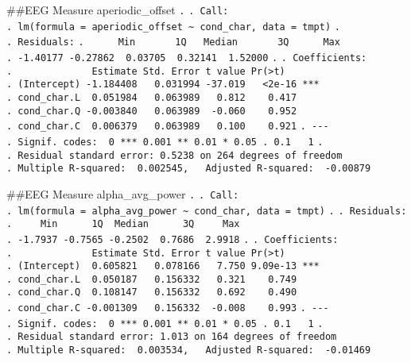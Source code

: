 \documentclass[
]{article}
\begin{document}
\#\#EEG Measure aperiodic\_offset \texttt{.} \texttt{.\ Call:}
\texttt{.\ lm(formula\ =\ aperiodic\_offset\ \textasciitilde{}\ cond\_char,\ data\ =\ tmpt)}
\texttt{.} \texttt{.\ Residuals:}
\texttt{.\ \ \ \ \ \ Min\ \ \ \ \ \ \ 1Q\ \ \ Median\ \ \ \ \ \ \ 3Q\ \ \ \ \ \ Max}
\texttt{.\ -1.40177\ -0.27862\ \ 0.03705\ \ 0.32141\ \ 1.52000}
\texttt{.} \texttt{.\ Coefficients:}
\texttt{.\ \ \ \ \ \ \ \ \ \ \ \ \ \ Estimate\ Std.\ Error\ t\ value\ Pr(\textgreater{}\textbar{}t\textbar{})}
\texttt{.\ (Intercept)\ -1.184408\ \ \ 0.031994\ -37.019\ \ \ \textless{}2e-16\ ***}
\texttt{.\ cond\_char.L\ \ 0.051984\ \ \ 0.063989\ \ \ 0.812\ \ \ \ 0.417}
\texttt{.\ cond\_char.Q\ -0.003840\ \ \ 0.063989\ \ -0.060\ \ \ \ 0.952}
\texttt{.\ cond\_char.C\ \ 0.006379\ \ \ 0.063989\ \ \ 0.100\ \ \ \ 0.921}
\texttt{.\ -\/-\/-}
\texttt{.\ Signif.\ codes:\ \ 0\ \textquotesingle{}***\textquotesingle{}\ 0.001\ \textquotesingle{}**\textquotesingle{}\ 0.01\ \textquotesingle{}*\textquotesingle{}\ 0.05\ \textquotesingle{}.\textquotesingle{}\ 0.1\ \textquotesingle{}\ \textquotesingle{}\ 1}
\texttt{.}
\texttt{.\ Residual\ standard\ error:\ 0.5238\ on\ 264\ degrees\ of\ freedom}
\texttt{.\ Multiple\ R-squared:\ \ 0.002545,\ \ \ Adjusted\ R-squared:\ \ -0.00879}

\#\#EEG Measure alpha\_avg\_power \texttt{.} \texttt{.\ Call:}
\texttt{.\ lm(formula\ =\ alpha\_avg\_power\ \textasciitilde{}\ cond\_char,\ data\ =\ tmpt)}
\texttt{.} \texttt{.\ Residuals:}
\texttt{.\ \ \ \ \ Min\ \ \ \ \ \ 1Q\ \ Median\ \ \ \ \ \ 3Q\ \ \ \ \ Max}
\texttt{.\ -1.7937\ -0.7565\ -0.2502\ \ 0.7686\ \ 2.9918} \texttt{.}
\texttt{.\ Coefficients:}
\texttt{.\ \ \ \ \ \ \ \ \ \ \ \ \ \ Estimate\ Std.\ Error\ t\ value\ Pr(\textgreater{}\textbar{}t\textbar{})}
\texttt{.\ (Intercept)\ \ 0.605821\ \ \ 0.078166\ \ \ 7.750\ 9.09e-13\ ***}
\texttt{.\ cond\_char.L\ \ 0.050187\ \ \ 0.156332\ \ \ 0.321\ \ \ \ 0.749}
\texttt{.\ cond\_char.Q\ \ 0.108147\ \ \ 0.156332\ \ \ 0.692\ \ \ \ 0.490}
\texttt{.\ cond\_char.C\ -0.001309\ \ \ 0.156332\ \ -0.008\ \ \ \ 0.993}
\texttt{.\ -\/-\/-}
\texttt{.\ Signif.\ codes:\ \ 0\ \textquotesingle{}***\textquotesingle{}\ 0.001\ \textquotesingle{}**\textquotesingle{}\ 0.01\ \textquotesingle{}*\textquotesingle{}\ 0.05\ \textquotesingle{}.\textquotesingle{}\ 0.1\ \textquotesingle{}\ \textquotesingle{}\ 1}
\texttt{.}
\texttt{.\ Residual\ standard\ error:\ 1.013\ on\ 164\ degrees\ of\ freedom}
\texttt{.\ Multiple\ R-squared:\ \ 0.003534,\ \ \ Adjusted\ R-squared:\ \ -0.01469}
\end{document}
